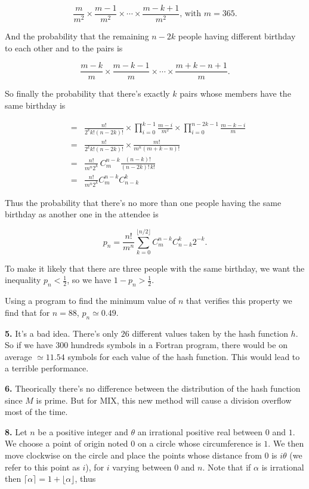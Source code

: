\documentclass[a4paper,12pt]{article}
\newcommand{\newpar}[1]{\bigskip \noindent \textbf{#1.}}
\begin{document}
\[ \frac{m}{m^2} \times \frac{m-1}{m^2} \times \cdots \times
\frac{m-k+1}{m^2},\,\mbox{with $m = 365$}.\]

And the probability that the remaining $n-2k$ people having different
birthday to each other and to the pairs is

\[ \frac{m-k}{m} \times \frac{m-k-1}{m} \times \cdots \times
\frac{m+k-n+1}{m}.\]

So finally the probability that there's exactly $k$ pairs whose
members have the same birthday is

\begin{eqnarray*}
  &=& \frac{n!}{2^kk!(n-2k)!}\times \prod_{i=0}^{k-1}\frac{m-i}{m^2}
  \times \prod_{i=0}^{n-2k-1} \frac{m-k-i}{m} \\
  &=& \frac{n!}{2^kk!(n-2k)!} \times \frac{m!}{m^n(m+k-n)!} \\
  &=& \frac{n!}{m^n2^k}\,C_m^{n-k} \frac{(n-k)!}{(n-2k)!\,k!} \\
  &=& \frac{n!}{m^n2^k} C_m^{n-k} C_{n-k}^k
\end{eqnarray*}

Thus the probability that there's no more than one people having the
same birthday as another one in the attendee is

\[ p_n = \frac{n!}{m^n} \sum_{k=0}^{\lfloor n/2\rfloor}
C_m^{n-k}C_{n-k}^k 2^{-k}.\]

To make it likely that there are three people with the same birthday,
we want the inequality $p_n < \frac{1}{2}$, so we have $1-p_n >
\frac{1}{2}$.

Using a program to find the minimum value of $n$ that verifies this
property we find that for $n = 88$, $p_n \simeq 0.49$.

\newpar{5} It's a bad idea.  There's only $26$ different values taken
by the hash function $h$.  So if we have $300$ hundreds symbols in a
Fortran program, there would be on average $\simeq 11.54$ symbols for
each value of the hash function.  This would lead to a terrible
performance.

\newpar{6} Theorically there's no difference between the distribution
of the hash function since $M$ is prime.  But for MIX, this new method
will cause a division overflow most of the time.

\newpar{8} Let $n$ be a positive integer and $\theta$ an irrational
positive real between $0$ and $1$.  We choose a point of origin noted
$0$ on a circle whose circumference is $1$.  We then move clockwise on
the circle and place the points whose distance from $0$ is $i\theta$
(we refer to this point as $i$), for $i$ varying between $0$ and $n$.
Note that if $\alpha$ is irrational then $\lceil \alpha\rceil =
1+\lfloor \alpha\rfloor$, thus
\end{document}
